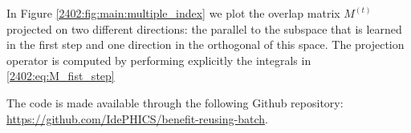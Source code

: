 In Figure \ref{2402:fig:main:multiple_index} we plot the overlap matrix $M^{(t)}$ projected on two different directions: the parallel to the subspace that is learned in the first step and one direction in the orthogonal of this space.
The projection operator is computed by performing explicitly the integrals in \eqref{2402:eq:M_fist_step}

The code is made available through the following Github repository: \href{https://github.com/IdePHICS/benefit-reusing-batch}{https://github.com/IdePHICS/benefit-reusing-batch}.
